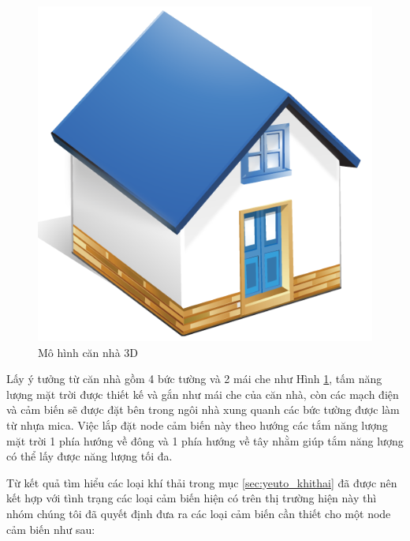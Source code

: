 \begin{figure}
    \includegraphics[scale=0.3]{house_home}
    \caption[Mô hình căn nhà 3D]{Mô hình căn nhà 3D}
    \label{fig:house_home}
\end{figure}
Lấy ý tưởng từ căn nhà gồm 4 bức tường và 2 mái che như Hình \ref{fig:house_home}, tấm năng lượng mặt trời được thiết kế và gắn như mái che của căn nhà, còn các mạch điện và cảm biến sẽ được đặt bên trong ngôi nhà xung quanh các bức tường được làm từ nhựa mica. Việc lắp đặt node cảm biến này theo hướng các tắm năng lượng mặt trời 1 phía hướng về đông và 1 phía hướng về tây nhằm giúp tắm năng lượng có thể lấy được năng lượng tối đa.

Từ kết quả tìm hiểu các loại khí thải trong mục \ref{sec:yeuto_khithai} đã được nên kết hợp với tình trạng các loại cảm biến hiện có trên thị trường hiện này thì nhóm chúng tôi đã quyết định đưa ra các loại cảm biến cần thiết cho một node cảm biến như sau:



